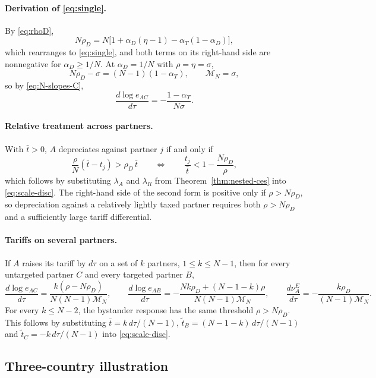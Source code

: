 \documentclass[11pt]{article}
\begin{document}
\paragraph{Derivation of \eqref{eq:single}.}
By \eqref{eq:rhoD},
\[
N\rho_D = N\big[ 1+\alpha_D(\eta-1)-\alpha_T(1-\alpha_D) \big],
\]
which rearranges to \eqref{eq:single}, and both terms on its right-hand side are nonnegative for $\alpha_D\geq1/N$. At $\alpha_D=1/N$ with $\rho=\eta=\sigma$,
\[
N\rho_D-\sigma = (N-1)(1-\alpha_T),
\qquad
\mathcal M_N = \sigma,
\]
so by \eqref{eq:N-slopes-C},
\[
\frac{d\log e_{AC}}{d\tau} = -\frac{1-\alpha_T}{N\sigma}.
\]

\paragraph{Relative treatment across partners.}
With $\bar t>0$, $A$ depreciates against partner $j$ if and only if
\begin{equation}
\frac{\rho}{N}(\bar t-t_j)>\rho_D\,\bar t
\qquad\Longleftrightarrow\qquad
\frac{t_j}{\bar t}<1-\frac{N\rho_D}{\rho},
\label{eq:reltreat}
\end{equation}
which follows by substituting $\lambda_A$ and $\lambda_R$ from Theorem~\ref{thm:nested-ces} into \eqref{eq:scale-disc}. The right-hand side of the second form is positive only if $\rho>N\rho_D$, so depreciation against a relatively lightly taxed partner requires both $\rho>N\rho_D$ and a sufficiently large tariff differential.

\paragraph{Tariffs on several partners.}
If $A$ raises its tariff by $d\tau$ on a set of $k$ partners, $1\leq k\leq N-1$, then for every untargeted partner $C$ and every targeted partner $B$,
\begin{equation}
\frac{d\log e_{AC}}{d\tau}=\frac{k(\rho-N\rho_D)}{N(N-1)\mathcal M_N}, \qquad
\frac{d\log e_{AB}}{d\tau}=-\frac{Nk\rho_D+(N-1-k)\rho}{N(N-1)\mathcal M_N}, \qquad
\frac{d\nu_A^E}{d\tau}=-\frac{k\rho_D}{(N-1)\mathcal M_N}.
\label{eq:k-targets}
\end{equation}
For every $k\leq N-2$, the bystander response has the same threshold $\rho>N\rho_D$. This follows by substituting $\bar t=k\,d\tau/(N-1)$, $\tilde t_B=(N-1-k)\,d\tau/(N-1)$ and $\tilde t_C=-k\,d\tau/(N-1)$ into \eqref{eq:scale-disc}.

\subsection{Three-country illustration}
\end{document}
